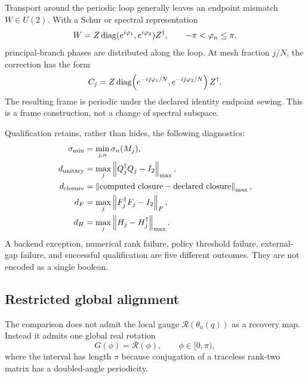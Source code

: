 Transport around the periodic loop generally leaves an endpoint mismatch
$W\in U(2)$.  With a Schur or spectral representation
\begin{equation}
 W=Z\operatorname{diag}(e^{i\varphi_1},e^{i\varphi_2})Z^\dagger,
 \qquad -\pi<\varphi_n\le\pi,
 \label{eq:closure-holonomy}
\end{equation}
principal-branch phases are distributed along the loop.  At mesh fraction $j/N$, the
correction has the form
\begin{equation}
 C_j=Z\operatorname{diag}\!\left(e^{-ij\varphi_1/N},e^{-ij\varphi_2/N}\right)Z^\dagger.
 \label{eq:closure-distribution}
\end{equation}
The resulting frame is periodic under the declared identity endpoint sewing.  This is a
frame construction, not a change of spectral subspace.

Qualification retains, rather than hides, the following diagnostics:
\begin{align}
 \sigma_{\min}&=\min_{j,n}\sigma_n(M_j),\\
 d_{\mathrm{unitary}}&=\max_j\left\lVert Q_j^\dagger Q_j-I_2\right\rVert_{\max},\\
 d_{\mathrm{closure}}&=\left\lVert \text{computed closure}-\text{declared closure}\right\rVert_{\max},\\
 d_F&=\max_j\left\lVert F_j^\dagger F_j-I_2\right\rVert_F,\\
 d_H&=\max_j\left\lVert H_j-H_j^\dagger\right\rVert_{\max}.
 \label{eq:transport-diagnostics}
\end{align}
A backend exception, numerical rank failure, policy threshold failure, external-gap
failure, and successful qualification are five different outcomes.  They are not
encoded as a single boolean.

\subsection{Restricted global alignment}

The comparison does not admit the local gauge $\mathcal R(\theta_a(q))$ as a recovery
map.  Instead it admits one global real rotation
\begin{equation}
 G(\phi)=\mathcal R(\phi),\qquad \phi\in[0,\pi),
 \label{eq:global-rotation}
\end{equation}
where the interval has length $\pi$ because conjugation of a traceless rank-two matrix
has a doubled-angle periodicity.

